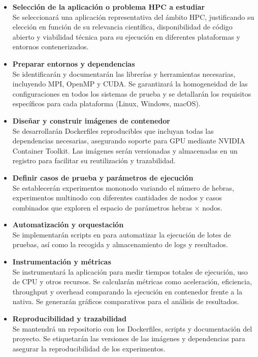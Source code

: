 \begin{itemize}
    \item \textbf{Selección de la aplicación o problema HPC a estudiar} \\
          Se seleccionará una aplicación representativa del ámbito HPC, justificando su elección en función de su relevancia científica, disponibilidad de código abierto y viabilidad técnica para su ejecución en diferentes plataformas y entornos contenerizados.

    \item \textbf{Preparar entornos y dependencias} \\
          Se identificarán y documentarán las librerías y herramientas necesarias, incluyendo MPI, OpenMP y CUDA. Se garantizará la homogeneidad de las configuraciones en todos los sistemas de prueba y se detallarán los requisitos específicos para cada plataforma (Linux, Windows, macOS).

    \item \textbf{Diseñar y construir imágenes de contenedor} \\
          Se desarrollarán Dockerfiles reproducibles que incluyan todas las dependencias necesarias, asegurando soporte para GPU mediante NVIDIA Container Toolkit. Las imágenes serán versionadas y almacenadas en un registro para facilitar su reutilización y trazabilidad.

    \item \textbf{Definir casos de prueba y parámetros de ejecución} \\
          Se establecerán experimentos mononodo variando el número de hebras, experimentos multinodo con diferentes cantidades de nodos y casos combinados que exploren el espacio de parámetros hebras × nodos.

    \item \textbf{Automatización y orquestación} \\
          Se implementarán scripts en para automatizar la ejecución de lotes de pruebas, así como la recogida y almacenamiento de logs y resultados.

    \item \textbf{Instrumentación y métricas} \\
          Se instrumentará la aplicación para medir tiempos totales de ejecución, uso de CPU y otros recursos. Se calcularán métricas como aceleración, eficiencia, throughput y overhead comparando la ejecución en contenedor frente a la nativa. Se generarán gráficos comparativos para el análisis de resultados.

    \item \textbf{Reproducibilidad y trazabilidad} \\
          Se mantendrá un repositorio con los Dockerfiles, scripts y documentación del proyecto. Se etiquetarán las versiones de las imágenes y dependencias para asegurar la reproducibilidad de los experimentos.
\end{itemize}


